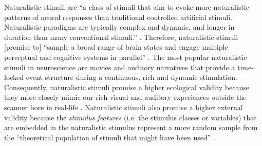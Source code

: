 Naturalistic stimuli are ``a class of stimuli that aim to evoke more
naturalistic patterns of neural responses than traditional controlled artificial
stimuli. Naturalistic paradigms are typically complex and dynamic, and longer in
duration than many conventional stimuli.'' \citep{vanderwal2019movies}.
%
Therefore, naturalistic stimuli [promise to] ``sample a broad range of brain
states and engage multiple perceptual and cognitive systems in parallel''
\citep{haxby2020naturalistic}.
The most popular naturalistic stimuli in neuroscience are movies and auditory
narratives \citep[s.][for reviews]{jaaskelainen2021movies,
jaaskelainen2020neural} that provide a time-locked event structure during a
continuous, rich and dynamic stimulation.
%
Consequently, naturalistic stimuli promise a higher ecological validity
\citep{zaki2009need, hasson2012future, hamilton2018revolution} because they more
closely mimic our rich visual and auditory experiences outside the scanner bore
in real-life \citep{hasson2008neurocinematics, haxby2020naturalistic}.
%
Naturalistic stimuli also promise a higher external validity because the
\textit{stimulus features} (i.e. the stimulus classes or variables) that are
embedded in the naturalistic stimulus represent a more random sample from the
``theoretical population of stimuli that might have been used''
\citep{westfall2016fixing}.
%


